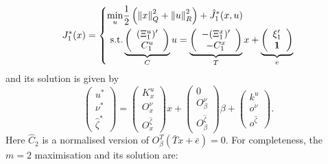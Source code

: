 \documentclass{ifacconf}
\providecommand{\norm}[1]{\left\|#1\right\|}
\begin{document}
\begin{equation}
	J_1^\ast(x) = \left\{\begin{split}
	\min_{u} & \frac{1}{2}\left(\norm{x}^2_Q + \norm{u}_R^2\right) + \hat J_{1}^\ast(x,u)\\
    \text{s.t.} & 
    \underbrace{\left(\begin{array}{c}
    (\Xi_1^u)^\prime \\ C_1^u
    \end{array}\right)}_{\bar C}
    u
    = \underbrace{\left(\begin{array}{c}-(\Xi^x_1)^\prime \\ -C_1^x\end{array}\right)}_{
    \bar T
    }x + 
    \underbrace{\left(\begin{array}{c}\xi_1^\prime\\  {\bf{1}} \end{array}\right)}_{\bar e}
    \end{split}\right.
\end{equation}
and its solution is given by
\begin{equation}
	\left(\begin{array}{c}
	u^\ast \\
	\nu^\ast \\
	\hat\zeta^\ast
	\end{array}\right) = \left(\begin{array}{c}K^u_x\\ O^{\nu}_x \\ O^{\hat\zeta}_x
	\end{array}\right)x + 
	\left(\begin{array}{c}0\\ O^{\nu}_\beta \\ O^{\hat\zeta}_{\beta}
	\end{array}\right)\beta + \left(\begin{array}{c}k^u\\ o^{\nu} \\ o^{\hat\zeta}
	\end{array}\right).
\end{equation}
Here $\hat C_2$ is a normalised version of $O^T_\beta(\bar T x + \bar e) = 0$.
For completeness, the $m=2$ maximisation and its solution are:
\end{document}
